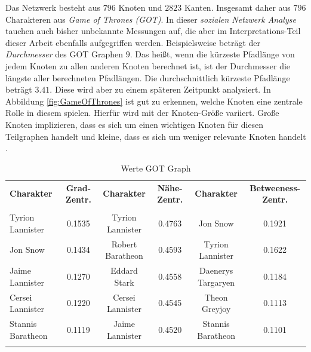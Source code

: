 Das Netzwerk besteht aus $796$ Knoten und $2823$ Kanten. Insgesamt daher aus $796$ Charakteren aus \textit{Game of Thrones (GOT)}.
In dieser \textit{sozialen Netzwerk Analyse} tauchen auch bisher unbekannte Messungen auf, die aber im Interpretations-Teil dieser Arbeit ebenfalls aufgegriffen werden. Beispielsweise beträgt der \textit{Durchmesser} des GOT Graphen $9$. Das heißt, wenn die kürzeste Pfadlänge von jedem Knoten zu allen anderen Knoten berechnet ist, ist der Durchmesser die längste aller berechneten Pfadlängen. Die durchschnittlich kürzeste Pfadlänge beträgt $3.41$. Diese wird aber zu einem späteren Zeitpunkt analysiert. In Abbildung \ref{fig:GameOfThrones} ist gut zu erkennen, welche Knoten eine zentrale Rolle in diesem spielen. Hierfür wird mit der Knoten-Größe variiert. Große Knoten implizieren, dass es sich um einen wichtigen Knoten für diesen Teilgraphen handelt und kleine, dass es sich um weniger relevante Knoten handelt \cite{GOT}. 
\begin{table}[h!]
\footnotesize
\caption{Werte GOT Graph}
\label{TableGOT}
\begin{tabular}{lccccc}\toprule 
\textbf{Charakter} &\textbf{Grad-Zentr.} & \textbf{Charakter} &\textbf{Nähe-Zentr.}  & \textbf{Charakter} &\textbf{Betweeness-Zentr.} \\
 &\\\midrule
  Tyrion Lannister & 0.1535  & Tyrion Lannister & 0.4763 & Jon Snow& 0.1921   \\
  Jon Snow & 0.1434 & Robert Baratheon & 0.4593 & Tyrion Lannister & 0.1622   \\
  Jaime Lannister & 0.1270  & Eddard Stark& 0.4558& Daenerys Targaryen & 0.1184   \\
  Cersei Lannister & 0.1220 & Cersei Lannister & 0.4545 & Theon Greyjoy & 0.1113   \\
  Stannis Baratheon & 0.1119 & Jaime Lannister & 0.4520 & Stannis Baratheon & 0.1101   \\
       
  \\\bottomrule
 \end{tabular}
 \end{table}
